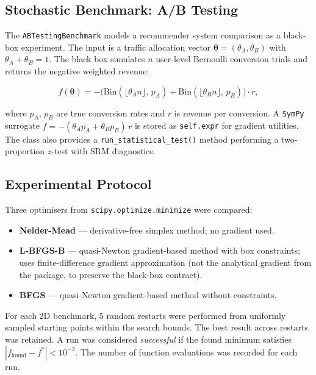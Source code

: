 \subsection{Stochastic Benchmark: A/B Testing}

The \texttt{ABTestingBenchmark} models a recommender system comparison
as a black-box experiment. The input is a traffic allocation vector
$\boldsymbol{\theta} = (\theta_A, \theta_B)$ with $\theta_A + \theta_B = 1$.
The black box simulates $n$ user-level Bernoulli conversion trials and
returns the negative weighted revenue:

\begin{equation}
f(\boldsymbol{\theta}) = -\bigl(
  \mathrm{Bin}(\lfloor\theta_A n\rfloor,\, p_A)
  + \mathrm{Bin}(\lfloor\theta_B n\rfloor,\, p_B)
\bigr) \cdot r,
\end{equation}

where $p_A$, $p_B$ are true conversion rates and $r$ is revenue per
conversion. A \texttt{SymPy} surrogate
$\tilde{f} = -(\theta_A p_A + \theta_B p_B)\,r$ is stored as
\texttt{self.expr} for gradient utilities. The class also provides a
\texttt{run\_statistical\_test()} method performing a two-proportion
$z$-test with SRM diagnostics.

\subsection{Experimental Protocol}

Three optimisers from \texttt{scipy.optimize.minimize} were compared:

\begin{itemize}
  \item \textbf{Nelder-Mead} — derivative-free simplex method; no gradient used.
  \item \textbf{L-BFGS-B} — quasi-Newton gradient-based method with box
        constraints; uses finite-difference gradient approximation (not the
        analytical gradient from the package, to preserve the black-box
        contract).
  \item \textbf{BFGS} — quasi-Newton gradient-based method without constraints.
\end{itemize}

For each 2D benchmark, 5 random restarts were performed from uniformly
sampled starting points within the search bounds. The best result across
restarts was retained. A run was considered \emph{successful} if the found
minimum satisfies $|f_{\text{found}} - f^*| < 10^{-2}$. The number of
function evaluations was recorded for each run.

